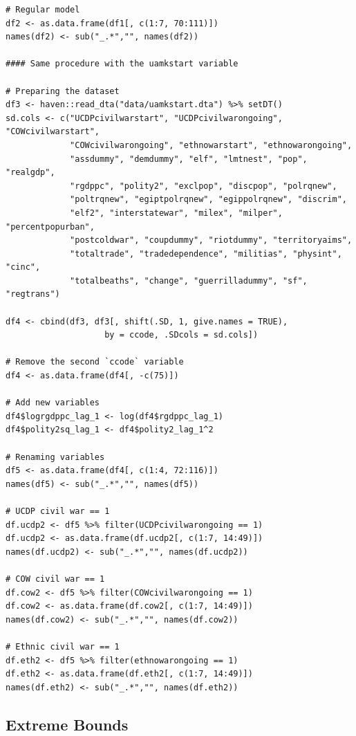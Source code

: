 \documentclass[a4paper,12pt]{article}
\begin{document}
\begin{verbatim}
# Regular model
df2 <- as.data.frame(df1[, c(1:7, 70:111)])
names(df2) <- sub("_.*","", names(df2)) 

#### Same procedure with the uamkstart variable

# Preparing the dataset
df3 <- haven::read_dta("data/uamkstart.dta") %>% setDT()
sd.cols <- c("UCDPcivilwarstart", "UCDPcivilwarongoing", "COWcivilwarstart",
             "COWcivilwarongoing", "ethnowarstart", "ethnowarongoing",
             "assdummy", "demdummy", "elf", "lmtnest", "pop", "realgdp",
             "rgdppc", "polity2", "exclpop", "discpop", "polrqnew",
             "poltrqnew", "egiptpolrqnew", "egippolrqnew", "discrim",
             "elf2", "interstatewar", "milex", "milper", "percentpopurban",
             "postcoldwar", "coupdummy", "riotdummy", "territoryaims",
             "totaltrade", "tradedependence", "militias", "physint", "cinc",
             "totalbeaths", "change", "guerrilladummy", "sf", "regtrans")

df4 <- cbind(df3, df3[, shift(.SD, 1, give.names = TRUE),
                    by = ccode, .SDcols = sd.cols]) 

# Remove the second `ccode` variable
df4 <- as.data.frame(df4[, -c(75)])

# Add new variables
df4$logrgdppc_lag_1 <- log(df4$rgdppc_lag_1)
df4$polity2sq_lag_1 <- df4$polity2_lag_1^2

# Renaming variables
df5 <- as.data.frame(df4[, c(1:4, 72:116)])
names(df5) <- sub("_.*","", names(df5)) 

# UCDP civil war == 1
df.ucdp2 <- df5 %>% filter(UCDPcivilwarongoing == 1)
df.ucdp2 <- as.data.frame(df.ucdp2[, c(1:7, 14:49)])
names(df.ucdp2) <- sub("_.*","", names(df.ucdp2)) 

# COW civil war == 1
df.cow2 <- df5 %>% filter(COWcivilwarongoing == 1)
df.cow2 <- as.data.frame(df.cow2[, c(1:7, 14:49)])
names(df.cow2) <- sub("_.*","", names(df.cow2)) 

# Ethnic civil war == 1
df.eth2 <- df5 %>% filter(ethnowarongoing == 1)
df.eth2 <- as.data.frame(df.eth2[, c(1:7, 14:49)])
names(df.eth2) <- sub("_.*","", names(df.eth2)) 
\end{verbatim}

\newpage

\normalsize

\subsection{Extreme Bounds}
\end{document}
